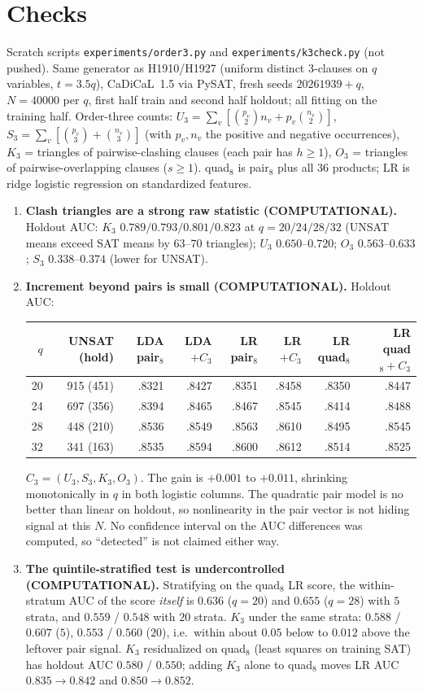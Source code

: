 \documentclass[11pt]{article}
\begin{document}
\section*{Checks}
Scratch scripts \texttt{experiments/order3.py} and \texttt{experiments/k3check.py} (not pushed). Same generator as H1910/H1927 (uniform distinct 3-clauses on $q$ variables, $t=3.5q$), CaDiCaL~1.5 via PySAT, fresh seeds $20261939+q$, $N=40000$ per $q$, first half train and second half holdout; all fitting on the training half.
Order-three counts: $U_3=\sum_v[\binom{p_v}{2}n_v+p_v\binom{n_v}{2}]$, $S_3=\sum_v[\binom{p_v}{3}+\binom{n_v}{3}]$ (with $p_v,n_v$ the positive and negative occurrences), $K_3$ = triangles of pairwise-clashing clauses (each pair has $h\ge1$), $O_3$ = triangles of pairwise-overlapping clauses ($s\ge1$). quad$_8$ is pair$_8$ plus all $36$ products; LR is ridge logistic regression on standardized features.
\begin{enumerate}
\item \textbf{Clash triangles are a strong raw statistic (COMPUTATIONAL).} Holdout AUC: $K_3$ $0.789/0.793/0.801/0.823$ at $q=20/24/28/32$ (UNSAT means exceed SAT means by $63$--$70$ triangles); $U_3$ $0.650$--$0.720$; $O_3$ $0.563$--$0.633$; $S_3$ $0.338$--$0.374$ (lower for UNSAT).
\item \textbf{Increment beyond pairs is small (COMPUTATIONAL).} Holdout AUC:
\begin{center}
\begin{tabular}{rrrrrrrr}
$q$ & UNSAT (hold) & LDA pair$_8$ & LDA $+C_3$ & LR pair$_8$ & LR $+C_3$ & LR quad$_8$ & LR quad$_8{+}C_3$\\\hline
20 & 915 (451) & .8321 & .8427 & .8351 & .8458 & .8350 & .8447\\
24 & 697 (356) & .8394 & .8465 & .8467 & .8545 & .8414 & .8488\\
28 & 448 (210) & .8536 & .8549 & .8563 & .8610 & .8495 & .8545\\
32 & 341 (163) & .8535 & .8594 & .8600 & .8612 & .8514 & .8525
\end{tabular}
\end{center}
$C_3=(U_3,S_3,K_3,O_3)$. The gain is $+0.001$ to $+0.011$, shrinking monotonically in $q$ in both logistic columns. The quadratic pair model is no better than linear on holdout, so nonlinearity in the pair vector is not hiding signal at this $N$. No confidence interval on the AUC differences was computed, so ``detected'' is not claimed either way.
\item \textbf{The quintile-stratified test is undercontrolled (COMPUTATIONAL).} Stratifying on the quad$_8$ LR score, the within-stratum AUC of the score \emph{itself} is $0.636$ ($q=20$) and $0.655$ ($q=28$) with $5$ strata, and $0.559$ / $0.548$ with $20$ strata. $K_3$ under the same strata: $0.588$ / $0.607$ ($5$), $0.553$ / $0.560$ ($20$), i.e.\ within about $0.05$ below to $0.012$ above the leftover pair signal. $K_3$ residualized on quad$_8$ (least squares on training SAT) has holdout AUC $0.580$ / $0.550$; adding $K_3$ alone to quad$_8$ moves LR AUC $0.835\to0.842$ and $0.850\to0.852$.
\end{enumerate}
\end{document}
